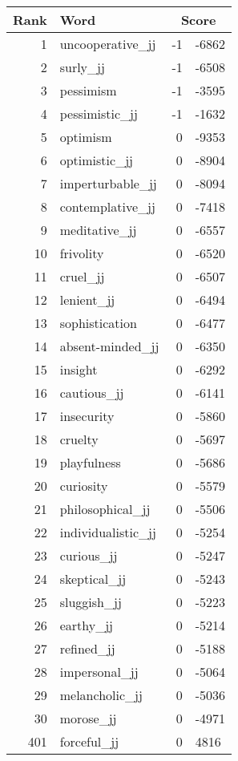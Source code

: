 \begin{longtable}[!htbp]{| rlr@{.}l |}
    \hline
    \textbf{Rank} & \textbf{Word} & \multicolumn{2}{c|}{\textbf{Score}} \\
    \hline
    \endhead
    1 & uncooperative\_jj & -1 & -6862 \\
    2 & surly\_jj & -1 & -6508 \\
    3 & pessimism & -1 & -3595 \\
    4 & pessimistic\_jj & -1 & -1632 \\
    5 & optimism & 0 & -9353 \\
    6 & optimistic\_jj & 0 & -8904 \\
    7 & imperturbable\_jj & 0 & -8094 \\
    8 & contemplative\_jj & 0 & -7418 \\
    9 & meditative\_jj & 0 & -6557 \\
    10 & frivolity & 0 & -6520 \\
    11 & cruel\_jj & 0 & -6507 \\
    12 & lenient\_jj & 0 & -6494 \\
    13 & sophistication & 0 & -6477 \\
    14 & absent-minded\_jj & 0 & -6350 \\
    15 & insight & 0 & -6292 \\
    16 & cautious\_jj & 0 & -6141 \\
    17 & insecurity & 0 & -5860 \\
    18 & cruelty & 0 & -5697 \\
    19 & playfulness & 0 & -5686 \\
    20 & curiosity & 0 & -5579 \\
    21 & philosophical\_jj & 0 & -5506 \\
    22 & individualistic\_jj & 0 & -5254 \\
    23 & curious\_jj & 0 & -5247 \\
    24 & skeptical\_jj & 0 & -5243 \\
    25 & sluggish\_jj & 0 & -5223 \\
    26 & earthy\_jj & 0 & -5214 \\
    27 & refined\_jj & 0 & -5188 \\
    28 & impersonal\_jj & 0 & -5064 \\
    29 & melancholic\_jj & 0 & -5036 \\
    30 & morose\_jj & 0 & -4971 \\
    401 & forceful\_jj & 0 & 4816 \\

\end{longtable}
